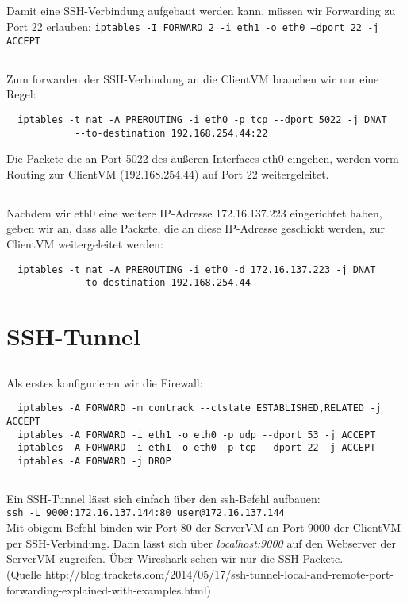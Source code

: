 \documentclass{scrartcl}
\begin{document}
\subsection{}
\label{sub:3.4}
Damit eine SSH-Verbindung aufgebaut werden kann, müssen wir Forwarding zu Port
22 erlauben: \texttt{iptables -I FORWARD 2 -i eth1 -o eth0 --dport 22 -j ACCEPT}

\subsection{}
\label{sub:3.5}
Zum forwarden der SSH-Verbindung an die ClientVM brauchen wir nur eine Regel:
\begin{lstlisting}
  iptables -t nat -A PREROUTING -i eth0 -p tcp --dport 5022 -j DNAT
            --to-destination 192.168.254.44:22
\end{lstlisting}
Die Packete die an Port 5022 des äußeren Interfaces eth0 eingehen, werden vorm
Routing zur ClientVM (192.168.254.44) auf Port 22 weitergeleitet.

\subsection{}
\label{sub:3.6}
Nachdem wir eth0 eine weitere IP-Adresse 172.16.137.223 eingerichtet haben,
geben wir an, dass alle Packete, die an diese IP-Adresse geschickt werden,
zur ClientVM weitergeleitet werden:
\begin{lstlisting}
  iptables -t nat -A PREROUTING -i eth0 -d 172.16.137.223 -j DNAT
            --to-destination 192.168.254.44
\end{lstlisting}

\section{SSH-Tunnel}
\label{sec:SSH-Tunnel}
\subsection{}
\label{sub:4.1}
Als erstes konfigurieren wir die Firewall:
\begin{lstlisting}
  iptables -A FORWARD -m contrack --ctstate ESTABLISHED,RELATED -j ACCEPT
  iptables -A FORWARD -i eth1 -o eth0 -p udp --dport 53 -j ACCEPT
  iptables -A FORWARD -i eth1 -o eth0 -p tcp --dport 22 -j ACCEPT
  iptables -A FORWARD -j DROP
\end{lstlisting}

\subsection{}
\label{sub:4.2}
Ein SSH-Tunnel lässt sich einfach über den ssh-Befehl aufbauen: \\
\texttt{ssh -L 9000:172.16.137.144:80 user@172.16.137.144}\\
Mit obigem Befehl binden wir Port 80 der ServerVM an Port 9000 der ClientVM
per SSH-Verbindung. Dann lässt sich über \textit{localhost:9000} auf den
Webserver der ServerVM zugreifen. Über Wireshark sehen wir nur die
SSH-Packete.\\
(Quelle http://blog.trackets.com/2014/05/17/ssh-tunnel-local-and-remote-port-forwarding-explained-with-examples.html)
\end{document}
